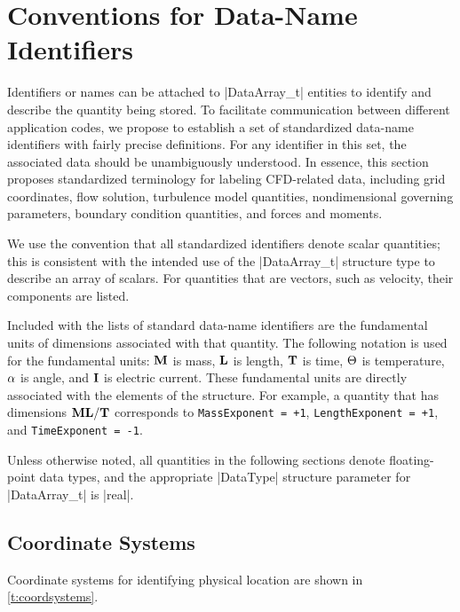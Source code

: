 \section{Conventions for Data-Name Identifiers} 
\label{s:dataname}
\thispagestyle{plain}

Identifiers or names can be attached to |DataArray_t| entities to
identify and describe the quantity being stored.  To facilitate
communication between different application codes, we propose to
establish a set of standardized data-name identifiers with fairly
precise definitions.  For any identifier in this set, the associated
data should be unambiguously understood.  In essence, this section
proposes standardized terminology for labeling CFD-related data,
including grid coordinates, flow solution, turbulence model quantities,
nondimensional governing parameters, boundary condition quantities, and
forces and moments.

We use the convention that all standardized identifiers denote
scalar quantities; this is consistent with the intended use of the
|DataArray_t| structure type to describe an array of scalars.  For
quantities that are vectors, such as velocity, their components are
listed.

Included with the lists of standard data-name identifiers are the
fundamental units of dimensions associated with that quantity.
The following notation is used for the fundamental units: ${\bf M}$ is mass,
${\bf L}$ is length, ${\bf T}$ is time, ${\Theta}$ is temperature, ${\alpha}$ is angle, and
${\bf I}$ is electric current.
These fundamental units are directly associated with the elements of the
 structure.
For example, a quantity that has dimensions ${\bf M}{\bf L}/{\bf T}$ corresponds to
\texttt{MassExponent = +1},
\texttt{LengthExponent = +1}, and
\texttt{TimeExponent = -1}.

Unless otherwise noted, all
quantities in the following sections denote floating-point data
types, and the appropriate |DataType| structure parameter for
|DataArray_t| is |real|.

\subsection{Coordinate Systems}
\label{s:dataname_grid}

Coordinate systems for identifying physical location are shown in \autoref{t:coordsystems}.

